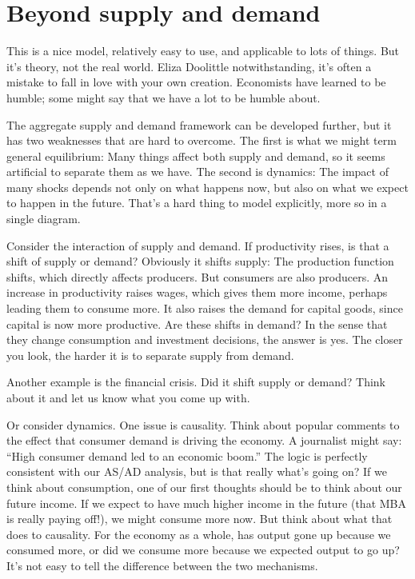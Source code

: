 \section{Beyond supply and demand}

This is a nice model, relatively easy to use,
and applicable to lots of things.
But it's theory, not the real world.
Eliza Doolittle notwithstanding,
it's often a mistake to fall in love with your own creation.
Economists have learned to be humble; some might say that we have a lot to be humble about.

The aggregate supply
 and demand framework can be developed
further, but it has two weaknesses that are hard to overcome.
The first is what we might term general equilibrium:
Many things affect both supply and demand, so it seems
artificial to separate them as we have.
The second is dynamics:  The impact of many shocks depends
not only on what happens now, but also on what we expect to happen
in the future.
That's a hard thing to model explicitly, more so in a single diagram.

Consider the interaction of supply and demand.
If productivity rises, is that a shift of supply or demand?
Obviously it shifts supply:  The production function shifts,
which directly affects producers.
But consumers are also producers.
An increase in productivity  raises wages,
which gives them more income, perhaps
leading them to consume more.
It also raises the demand for capital goods,
since capital is now more productive.
Are these shifts in demand?
In the sense that they change consumption and investment
decisions, the answer is yes.
The closer you look, the harder it is to separate
supply from demand.

Another example is the financial crisis.
Did it shift supply or demand?
Think about it and let us know what you come up with.

Or consider dynamics.
One issue is causality.
Think about popular comments to the effect that
consumer demand is driving the economy.
A journalist might say:  ``High consumer demand led to an economic boom.''
The logic is perfectly consistent with our AS/AD analysis,
but is that really what's going on?
If we think about consumption,
one of our first thoughts should be to think about our future income.
If we expect to have much higher income in the future
(that MBA is really paying off!),
we might consume more now.
But think about what that does to causality. For the economy as a whole, has output gone up because we consumed
more, or did we consume more because we expected output to go up?
It's not easy to tell the difference between the two mechanisms.

